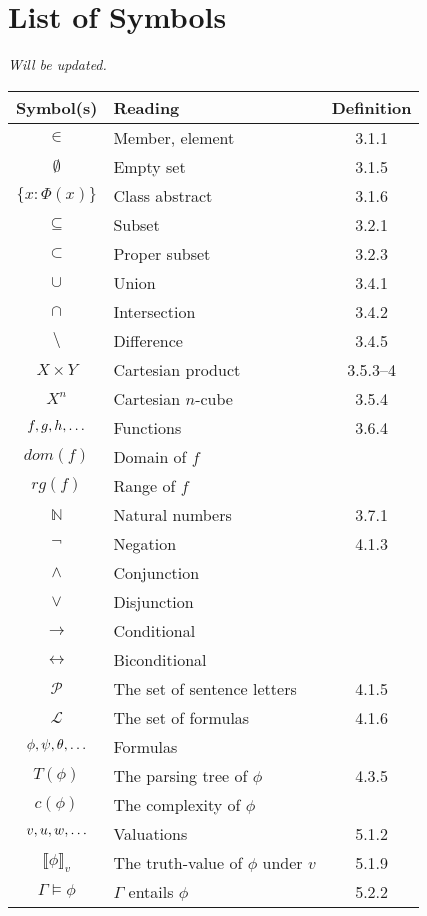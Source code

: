 \chapter{List of Symbols}

\emph{Will be updated.}

	\begin{longtable}{c | l | c}
	\textbf{Symbol(s)} & \textbf{Reading} & \textbf{Definition}\\\hline
	$\in$ & Member, element & 3.1.1\\
	$\emptyset$ & Empty set & 3.1.5\\
	$\{x:\Phi(x)\}$ & Class abstract & 3.1.6\\
	$\subseteq$ & Subset & 3.2.1\\
	$\subset$ & Proper subset & 3.2.3\\
	$\cup$ & Union & 3.4.1\\
	$\cap$ & Intersection & 3.4.2\\
	$\setminus$ & Difference & 3.4.5\\
	$X\times Y$ & Cartesian product & 3.5.3--4\\
	$X^n$ & Cartesian $n$-cube & 3.5.4\\
	$f,g,h, \mathellipsis$ & Functions & 3.6.4\\
	$dom(f)$ & Domain of $f$ \\
	$rg(f)$ & Range of $f$\\
	$\mathbb{N}$ & Natural numbers & 3.7.1\\
	$\neg$ & Negation & 4.1.3\\
	$\land$ & Conjunction \\
	$\lor$ & Disjunction \\
	$\to$ & Conditional \\
	$\leftrightarrow$ & Biconditional \\
	$\mathcal{P}$ & The set of sentence letters & 4.1.5\\
	$\mathcal{L}$ & The set of formulas & 4.1.6\\
	$\phi,\psi,\theta,\mathellipsis$ & Formulas\\
	$T(\phi)$ & The parsing tree of $\phi$ & 4.3.5 \\
	$c(\phi)$ & The complexity of $\phi$ & \\
	$v,u,w,\mathellipsis$ & Valuations & 5.1.2\\
	$\llbracket\phi\rrbracket_v$ & The truth-value of $\phi$ under $v$ & 5.1.9\\
	$\Gamma\vDash\phi$ & $\Gamma$ entails $\phi$ & 5.2.2\\
	\end{longtable}
	
